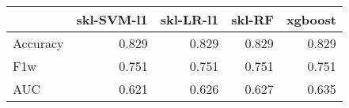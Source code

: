 \begin{tabular}{lrrrr}
\toprule
{} &  skl-SVM-l1 &  skl-LR-l1 &  skl-RF &  xgboost \\
\midrule
Accuracy &       0.829 &      0.829 &   0.829 &    0.829 \\
F1w      &       0.751 &      0.751 &   0.751 &    0.751 \\
AUC      &       0.621 &      0.626 &   0.627 &    0.635 \\
\bottomrule
\end{tabular}

